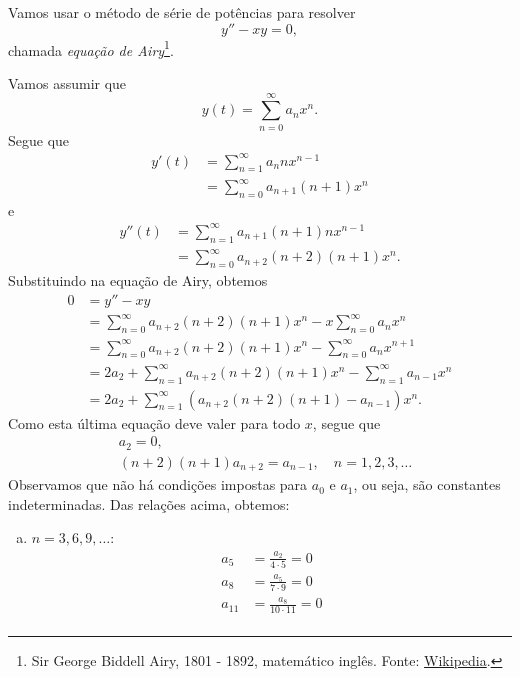 \begin{ex}
  Vamos usar o método de série de potências para resolver
  \begin{equation}
    y'' - xy = 0,
  \end{equation}
  chamada \emph{equação de Airy}\footnote{Sir George Biddell Airy, 1801 - 1892, matemático inglês. Fonte: \href{https://en.wikipedia.org/wiki/George_Biddell_Airy}{Wikipedia}.}.

  Vamos assumir que
  \begin{equation}
    y(t) = \sum_{n=0}^{\infty} a_nx^n.
  \end{equation}
  Segue que
  \begin{align}
    y'(t) &= \sum_{n=1}^\infty a_{n}nx^{n-1} \\
    &= \sum_{n=0}^\infty a_{n+1}(n+1)x^n
  \end{align}
  e
  \begin{align}
    y''(t) &= \sum_{n=1}^\infty a_{n+1}(n+1)nx^{n-1} \\
    &= \sum_{n=0}^\infty a_{n+2}(n+2)(n+1)x^n.
  \end{align}
  Substituindo na equação de Airy, obtemos
  \begin{align}
    0 &= y'' - xy \\
    &= \sum_{n=0}^\infty a_{n+2}(n+2)(n+1)x^n - x\sum_{n=0}^\infty a_{n}x^n \\
    &= \sum_{n=0}^\infty a_{n+2}(n+2)(n+1)x^n - \sum_{n=0}^\infty a_{n}x^{n+1} \\
    &= 2a_2 + \sum_{n=1}^\infty a_{n+2}(n+2)(n+1)x^n - \sum_{n=1}^\infty a_{n-1}x^{n} \\
    &= 2a_2 + \sum_{n=1}^\infty (a_{n+2}(n+2)(n+1) - a_{n-1})x^n.
  \end{align}
  Como esta última equação deve valer para todo $x$, segue que
  \begin{align}
    & a_2 = 0, \\
    & (n+2)(n+1)a_{n+2} = a_{n-1},\quad n=1, 2, 3, \ldots
  \end{align}
  Observamos que não há condições impostas para $a_0$ e $a_1$, ou seja, são constantes indeterminadas. Das relações acima, obtemos:
  \begin{enumerate}[a)]
  \item $n = 3, 6, 9, \ldots$:
    \begin{align}
      a_5 &= \frac{a_2}{4\cdot 5} = 0 \\
      a_8 &= \frac{a_5}{7\cdot 9} = 0 \\
      a_{11} &= \frac{a_{8}}{10\cdot 11} = 0 \\

\end{align}
\end{enumerate}
\end{ex}
